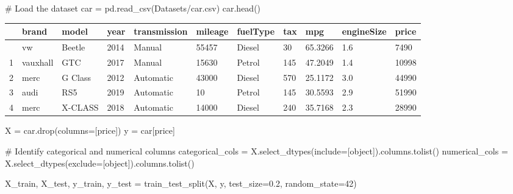 \documentclass[
  letterpaper,
  DIV=11,
  numbers=noendperiod]{scrreprt}
\newenvironment{Shaded}{\begin{snugshade}}{\end{snugshade}}
\newcommand{\CommentTok}[1]{\textcolor[rgb]{0.37,0.37,0.37}{#1}}
\newcommand{\DecValTok}[1]{\textcolor[rgb]{0.68,0.00,0.00}{#1}}
\newcommand{\FloatTok}[1]{\textcolor[rgb]{0.68,0.00,0.00}{#1}}
\newcommand{\NormalTok}[1]{\textcolor[rgb]{0.00,0.23,0.31}{#1}}
\newcommand{\OperatorTok}[1]{\textcolor[rgb]{0.37,0.37,0.37}{#1}}
\newcommand{\StringTok}[1]{\textcolor[rgb]{0.13,0.47,0.30}{#1}}
\begin{document}
\begin{Shaded}
\begin{Highlighting}[]
\CommentTok{\# Load the dataset}
\NormalTok{car }\OperatorTok{=}\NormalTok{ pd.read\_csv(}\StringTok{\textquotesingle{}Datasets/car.csv\textquotesingle{}}\NormalTok{)}
\NormalTok{car.head()}
\end{Highlighting}
\end{Shaded}

\begin{longtable}[]{@{}lllllllllll@{}}
\toprule\noalign{}
& brand & model & year & transmission & mileage & fuelType & tax & mpg &
engineSize & price \\
\midrule\noalign{}
\endhead
\bottomrule\noalign{}
\endlastfoot
0 & vw & Beetle & 2014 & Manual & 55457 & Diesel & 30 & 65.3266 & 1.6 &
7490 \\
1 & vauxhall & GTC & 2017 & Manual & 15630 & Petrol & 145 & 47.2049 &
1.4 & 10998 \\
2 & merc & G Class & 2012 & Automatic & 43000 & Diesel & 570 & 25.1172 &
3.0 & 44990 \\
3 & audi & RS5 & 2019 & Automatic & 10 & Petrol & 145 & 30.5593 & 2.9 &
51990 \\
4 & merc & X-CLASS & 2018 & Automatic & 14000 & Diesel & 240 & 35.7168 &
2.3 & 28990 \\
\end{longtable}

\begin{Shaded}
\begin{Highlighting}[]
\NormalTok{X }\OperatorTok{=}\NormalTok{ car.drop(columns}\OperatorTok{=}\NormalTok{[}\StringTok{\textquotesingle{}price\textquotesingle{}}\NormalTok{])}
\NormalTok{y }\OperatorTok{=}\NormalTok{ car[}\StringTok{\textquotesingle{}price\textquotesingle{}}\NormalTok{]}


\CommentTok{\# Identify categorical and numerical columns}
\NormalTok{categorical\_cols }\OperatorTok{=}\NormalTok{ X.select\_dtypes(include}\OperatorTok{=}\NormalTok{[}\StringTok{\textquotesingle{}object\textquotesingle{}}\NormalTok{]).columns.tolist()}
\NormalTok{numerical\_cols }\OperatorTok{=}\NormalTok{ X.select\_dtypes(exclude}\OperatorTok{=}\NormalTok{[}\StringTok{\textquotesingle{}object\textquotesingle{}}\NormalTok{]).columns.tolist()}

\NormalTok{X\_train, X\_test, y\_train, y\_test }\OperatorTok{=}\NormalTok{ train\_test\_split(X, y, test\_size}\OperatorTok{=}\FloatTok{0.2}\NormalTok{, random\_state}\OperatorTok{=}\DecValTok{42}\NormalTok{)}
\end{Highlighting}
\end{Shaded}
\end{document}
